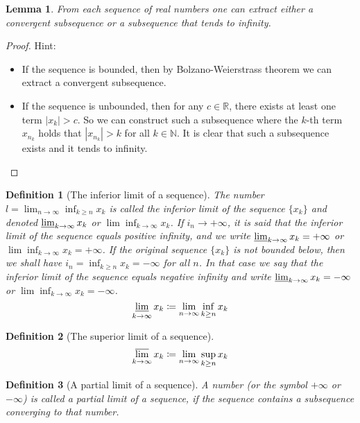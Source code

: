 \documentclass[onecolumn]{ctexart}
\newtheorem{definition}{Definition}
\newtheorem{lemma}{Lemma}
\begin{document}
\begin{lemma}
  From each sequence of real numbers one can extract either a convergent 
  subsequence or a subsequence that tends to infinity.
\end{lemma}
\begin{proof}
  Hint:
  \begin{itemize}
    \item If the sequence is bounded, then by Bolzano-Weierstrass theorem we can 
    extract a convergent subsequence.
    \item If the sequence is unbounded, then for any $c \in \mathbb{R}$, there 
    exists at least one term $|x_k| > c$. So we can construct such a subsequence 
    where the $k$-th term $x_{n_k}$ holds that $|x_{n_k}| > k$ for all $k \in 
    \mathbb{N}$. It is clear that such a subsequence exists and it tends to 
    infinity.
  \end{itemize}
\end{proof}

\begin{definition}[The inferior limit of a sequence]
  The number $l = \lim_{n \to \infty} \inf_{k \geq n} x_k$ is called the inferior 
  limit of the sequence $\lbrace x_k \rbrace$ and denoted 
  $\varliminf_{k \to \infty} x_k$ or $\lim \inf_{k \to \infty} x_k$. If $i_n \to 
  +\infty$, it is said that the inferior limit of the sequence equals positive 
  infinity, and we write $\varliminf_{k \to \infty} x_k = +\infty$ or $\lim 
  \inf_{k \to \infty} x_k = +\infty$. If the original sequence $\lbrace x_k 
  \rbrace$ is not bounded below, then we shall have $i_n = \inf_{k \geq n} x_k = 
  -\infty$ for all $n$. In that case we say that the inferior limit of the 
  sequence equals negative infinity and write $\varliminf_{k \to \infty} x_k = 
  -\infty$ or $\lim \inf_{k \to \infty} x_k = -\infty$.
  \[
    \varliminf_{k \to \infty} x_k \coloneqq \lim_{n \to \infty} \inf_{k \geq n} x_k
  \]
\end{definition}

\begin{definition}[The superior limit of a sequence]
  \[
    \varlimsup_{k \to \infty} x_k \coloneqq \lim_{n \to \infty} \sup_{k \geq n} x_k
  \]
\end{definition}

\begin{definition}[A partial limit of a sequence]
  A number (or the symbol $+\infty$ or $-\infty$) is called a partial limit of a 
  sequence, if the sequence contains a subsequence converging to that number.
\end{definition}
\end{document}

